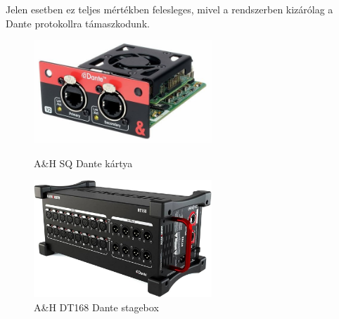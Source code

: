Jelen esetben ez teljes mértékben felesleges, mivel a rendszerben kizárólag a Dante protokollra támaszkodunk.
\begin{figure}[H]
    \centering
    \begin{minipage}{0.45\textwidth}
        \centering
        \includegraphics[width=67mm, keepaspectratio]{figures/sq_dante.jpg}
        \caption{A\&H SQ Dante kártya}\label{fig:sq_dante}
    \end{minipage}\hfill
    \begin{minipage}{0.45\textwidth}
        \centering
        \includegraphics[width=67mm, keepaspectratio]{figures/dt168.jpg}
        \caption{A\&H DT168 Dante stagebox}\label{fig:dt168}
    \end{minipage}
\end{figure}

